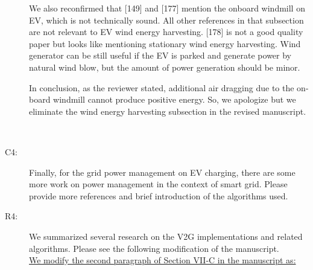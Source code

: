 \documentclass[onecolumn]{IEEEconf}
\begin{document}
\begin{description}
We also reconfirmed that [149] and [177] mention the onboard windmill on EV, which is not technically sound. All other references in that subsection are not relevant to EV wind energy harvesting. [178] is not a good quality paper but looks like mentioning stationary wind energy harvesting. Wind generator can be still useful if the EV is parked and generate power by natural wind blow, but the amount of power generation should be minor.

In conclusion, as the reviewer stated, additional air dragging due to the on-board windmill cannot produce positive energy. So, we apologize but we eliminate the wind energy harvesting subsection in the revised manuscript. 

~\\

\item [C4: ] Finally, for the grid power management on EV charging, there are some more work on power management in the context of smart grid. Please provide more references and brief introduction of the algorithms used.
\item [R4: ] We summarized several research on the V2G implementations and related algorithms. Please see the following modification of the manuscript.\\

\underline{We modify the second paragraph of Section VII-C in the manuscript as:}\\


\end{description}
\end{document}
